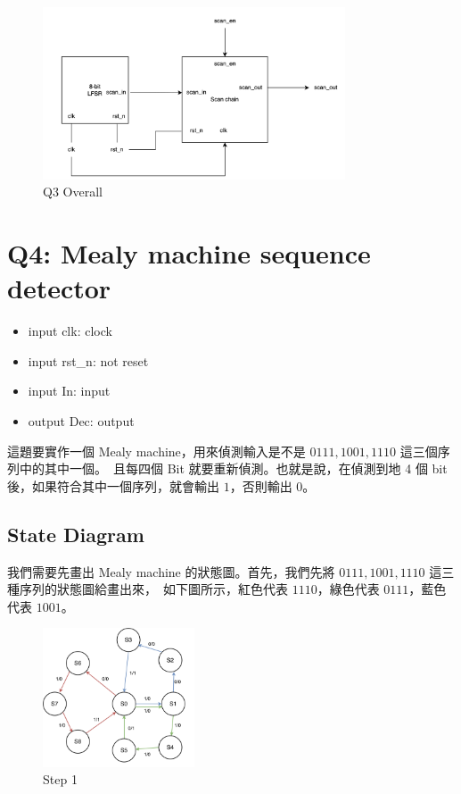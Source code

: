 \documentclass[10.5pt,compsoc,UTF8]{CjC}
\theoremstyle{mystyle}
\begin{document}
\begin{figure}[h!]
  \centering
  \includegraphics[width=0.8\textwidth]{./img/Q3.png}
  \caption{Q3 Overall}
  \label{fig:Q3-Overall}
\end{figure}

\section{Q4: Mealy machine sequence detector}
\begin{itemize}
  \item input clk: clock
  \item input rst\_n: not reset
  \item input In: input
  \item output Dec: output
\end{itemize}

這題要實作一個 Mealy machine，用來偵測輸入是不是 $0111, 1001, 1110$ 這三個序列中的其中一個。\
且每四個 Bit 就要重新偵測。也就是說，在偵測到地 4 個 bit 後，如果符合其中一個序列，就會輸出 $1$，否則輸出 $0$。

\subsection{State Diagram}

我們需要先畫出 Mealy machine 的狀態圖。首先，我們先將 $0111, 1001, 1110$ 這三種序列的狀態圖給畫出來，\
如下圖所示，紅色代表 $1110$，綠色代表 $0111$，藍色代表 $1001$。

\begin{figure}[h!]
  \centering
  \includegraphics[width=0.4\textwidth]{./img/Q4-SD1.png}
  \caption{Step 1}
  \label{fig:SD1}
\end{figure}
\end{document}
